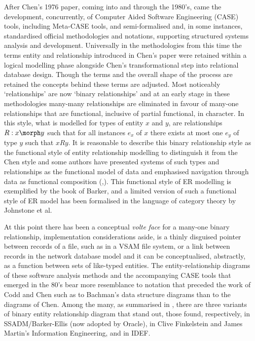After Chen's 1976 paper, coming into and through the 1980's, came the development, concurrently, of Computer Aided Software Engineering (CASE) tools, including Meta-CASE tools, and semi-formalised and, in some instances, standardised official methodologies and notations, supporting structured systems analysis and development. Universally in the methodologies from this time the terms entity and relationship introduced in Chen's paper  were retained within a logical modelling phase alongside Chen's transformational step into relational database design. Though the terms and the overall shape of the process are retained the concepts behind these terms are adjusted. Most noticeably `relationships' are now `binary relationships' and at an early stage in these methodologies many-many relationships are eliminated in favour of many-one relationships that are functional, inclusive of partial functional,  in character.
In this style, what is modelled  for  types of entity $x$ and $y$, are  relationships $R: x \morph y$ such that for all instances $e_x$ of $x$
there exists at most one $e_y$ of type $y$ such that $x R y$. It is reasonable to describe this  binary relationship style as the functional style of entity relationship modelling to distinguish it from the Chen style
and some authors have presented  systems of such types and relationships as the functional model of data and emphasised navigation through data as 
functional composition (\cite{Buneman1979},\cite{Shipman1981}). 
This functional style of ER modelling is exemplified by the
book of Barker, and a limited version of such a functional style of ER model has been formalised in the language of category theory by Johnstone et al. 

At this point there has been a conceptual \textit{volte face} for a many-one  binary relationship, implementation considerations aside, is a thinly disguised pointer between records of a file, such as in a VSAM file system,  or a link between records in the network database model and it can be conceptualised, abstractly, as a function between sets of like-typed entities. The entity-relationship diagrams of these software analysis  methods and the accompanying CASE tools
that emerged in the 80's bear more resemblance to notation that preceded the work of Codd and Chen such as to Bachman's data structure diagrams than to the diagrams of Chen.  
Among the many, as summarised in  \cite{Rock-Evans1989},  there are three variants of binary entity relationship diagram that stand out, those found, respectively,  in SSADM/Barker-Ellis (now adopted by Oracle), in Clive Finkelstein and James Martin's Information Engineering,  and in IDEF.

